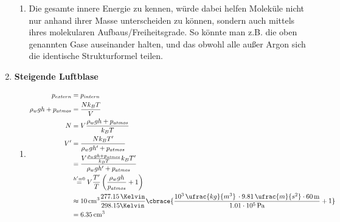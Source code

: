 \documentclass[11pt,letterpaper]{article}
\begin{document}
\begin{enumerate}
\begin{enumerate}
      \item
        Die gesamte innere Energie zu kennen, würde dabei helfen Moleküle nicht nur anhand
        ihrer Masse unterscheiden zu können, sondern auch mittels ihres molekularen Aufbaus/Freiheitsgrade. 
        So könnte man z.B. die oben genannten Gase auseinander halten, und das obwohl alle 
        außer Argon sich die identische Strukturformel teilen.
    \end{enumerate}

  \item \textbf{Steigende Luftblase}
    \begin{enumerate}
      \item
        \begin{align*}
          p_{extern} &=  p_{intern}\\
          \rho_w g h + p_{atmos} &=  \frac{Nk_BT}{V}\\
          N &= V\frac{\rho_w g h + p_{atmos}}{k_B T}\\
          V' &= \frac{N k_B T'}{\rho_w g h' + p_{atmos}}\\
          &= \frac{V\frac{\rho_w g h + p_{atmos}}{k_B T} k_B T'}{\rho_w g h' + p_{atmos}}\\
          &\overset{h'=0}{=} V \frac{T'}{ T} \left(\frac{\rho_w g h}{ p_{atmos}} +1 \right)\\
          &\approx 10\,\mathrm{cm^3} \frac{277.15\,\Kelvin}{298.15\Kelvin}
          \cbrace{ \frac{10^3 \,\ufrac{kg}{m^3} \, \cdot 9.81\,\ufrac{m}{s^2} \cdot 60\,\mathrm{m}}
          {1.01\cdot 10^5 \,\mathrm{Pa}} +1 } \\
          &= 6.35\,\mathrm{cm}^3\\
        \end{align*}


\end{enumerate}
\end{enumerate}
\end{document}
